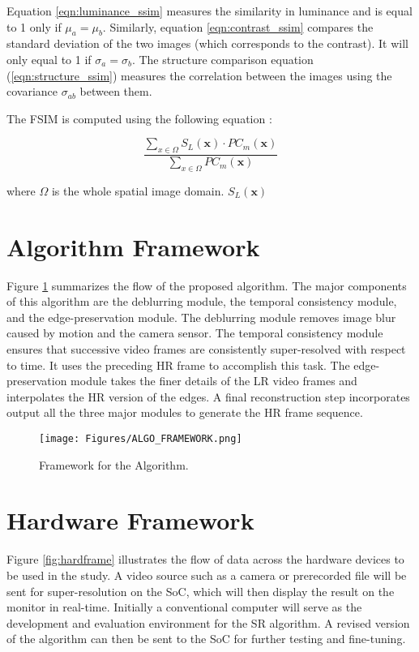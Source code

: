 Equation \ref{eqn:luminance_ssim} measures the similarity in luminance and is equal to 1 only if $\mu_a=\mu_b$.
Similarly, equation \ref{eqn:contrast_ssim} compares the standard deviation of the two images (which corresponds to the contrast). 
It will only equal to 1 if $\sigma_a=\sigma_b$.
The structure comparison equation (\ref{eqn:structure_ssim}) measures the correlation between the images using the covariance $\sigma_{ab}$ between them.

The FSIM is computed using the following equation \citep{Zhang2011a}:

\begin{equation}
\frac{\sum_{x\in\Omega}S_L(\mathbf{x})\cdot PC_m(\mathbf{x})}{{\sum_{x\in\Omega}PC_m(\mathbf{x})}}
\end{equation}

where $\Omega$ is the whole spatial image domain.
$S_L(\mathbf{x})$

\section{Algorithm Framework}

Figure \ref{fig:algoframe} summarizes the flow of the proposed algorithm.
The major components of this algorithm are the deblurring module, the temporal consistency module, and the edge-preservation module.
The deblurring module removes image blur caused by motion and the camera sensor.
The temporal consistency module ensures that successive video frames are consistently super-resolved with respect to time.
It uses the preceding HR frame to accomplish this task.
The edge-preservation module takes the finer details of the LR video frames and interpolates the HR version of the edges.
A final reconstruction step incorporates output all the three major modules to generate the HR frame sequence.

\begin{figure}[!ht]
	\centering
	\texttt{[image: Figures/ALGO\_FRAMEWORK.png]}
	\caption[]{Framework for the Algorithm.}
	\label{fig:algoframe}
\end{figure}




\section{Hardware Framework}
Figure \ref{fig:hardframe} illustrates the flow of data across the hardware devices to be used in the study.
A video source such as a camera or prerecorded file will be sent for super-resolution on the SoC, which will then display the result on the monitor in real-time.
Initially a conventional computer will serve as the development and evaluation  environment for the SR algorithm.
A revised version of the algorithm can then be sent to the SoC for further testing and fine-tuning.

